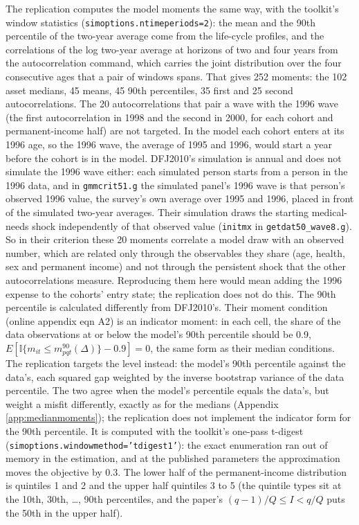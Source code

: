 \documentclass[11pt,fleqn]{article}
\begin{document}
The replication computes the model moments the same way, with the toolkit's window statistics (\texttt{simoptions.ntimeperiods=2}): the mean and the 90th percentile of the two-year average come from the life-cycle profiles, and the correlations of the log two-year average at horizons of two and four years from the autocorrelation command, which carries the joint distribution over the four consecutive ages that a pair of windows spans. That gives 252 moments: the 102 asset medians, 45 means, 45 90th percentiles, 35 first and 25 second autocorrelations. The 20 autocorrelations that pair a wave with the 1996 wave (the first autocorrelation in 1998 and the second in 2000, for each cohort and permanent-income half) are not targeted. In the model each cohort enters at its 1996 age, so the 1996 wave, the average of 1995 and 1996, would start a year before the cohort is in the model. DFJ2010's simulation is annual and does not simulate the 1996 wave either: each simulated person starts from a person in the 1996 data, and in \texttt{gmmcrit51.g} the simulated panel's 1996 wave is that person's observed 1996 value, the survey's own average over 1995 and 1996, placed in front of the simulated two-year averages. Their simulation draws the starting medical-needs shock independently of that observed value (\texttt{initmx} in \texttt{getdat50\_wave8.g}). So in their criterion these 20 moments correlate a model draw with an observed number, which are related only through the observables they share (age, health, sex and permanent income) and not through the persistent shock that the other autocorrelations measure. Reproducing them here would mean adding the 1996 expense to the cohorts' entry state; the replication does not do this. The 90th percentile is calculated differently from DFJ2010's. Their moment condition (online appendix eqn A2) is an indicator moment: in each cell, the share of the data observations at or below the model's 90th percentile should be 0.9, $E[\mathbb{I}\{m_{it}\leq m^{90}_{pqt}(\Delta)\}-0.9]=0$, the same form as their median conditions. The replication targets the level instead: the model's 90th percentile against the data's, each squared gap weighted by the inverse bootstrap variance of the data percentile. The two agree when the model's percentile equals the data's, but weight a misfit differently, exactly as for the medians (Appendix \ref{app:medianmoments}); the replication does not implement the indicator form for the 90th percentile. It is computed with the toolkit's one-pass t-digest (\texttt{simoptions.windowmethod='tdigest1'}): the exact enumeration ran out of memory in the estimation, and at the published parameters the approximation moves the objective by 0.3. The lower half of the permanent-income distribution is quintiles 1 and 2 and the upper half quintiles 3 to 5 (the quintile types sit at the 10th, 30th, \dots, 90th percentiles, and the paper's $(q-1)/Q\leq I<q/Q$ puts the 50th in the upper half).
\end{document}
